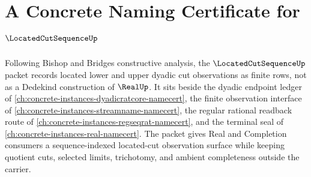 \chapter{A Concrete Naming Certificate for $\LocatedCutSequenceUp$}
\label{ch:concrete-instances-located-cut-sequence-namecert}

Following Bishop and Bridges constructive analysis, the $\LocatedCutSequenceUp$ packet records located lower and upper dyadic cut observations as finite rows, not as a Dedekind construction of $\RealUp$. It sits beside the dyadic endpoint ledger of \autoref{ch:concrete-instances-dyadicratcore-namecert}, the finite observation interface of \autoref{ch:concrete-instances-streamname-namecert}, the regular rational readback route of \autoref{ch:concrete-instances-regseqrat-namecert}, and the terminal seal of \autoref{ch:concrete-instances-real-namecert}. The packet gives Real and Completion consumers a sequence-indexed located-cut observation surface while keeping quotient cuts, selected limits, trichotomy, and ambient completeness outside the carrier.

